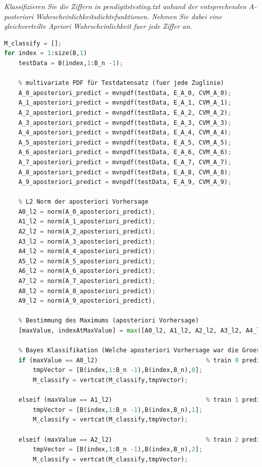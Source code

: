 \documentclass[12pt]{article}
\begin{document}
\textit{Klassifizieren Sie die Ziffern in pendigits­testing.txt​ anhand der entsprechenden A­-posteriori­ Wahrscheinlichkeitsdichtefunktionen. Nehmen Sie dabei eine gleichverteilte A­priori ­Wahrscheinlichkeit fuer jede Ziffer an.}
\begin{lstlisting}[language=Python]
% Klassifizierung der Testdaten (Metrik: L2-Norm)
M_classify = [];
for index = 1:size(B,1)
    testData = B(index,1:B_n -1);
    
    % multivariate PDF für Testdatensatz (fuer jede Zuglinie)
    A_0_aposteriori_predict = mvnpdf(testData, E_A_0, CVM_A_0);
    A_1_aposteriori_predict = mvnpdf(testData, E_A_1, CVM_A_1);
    A_2_aposteriori_predict = mvnpdf(testData, E_A_2, CVM_A_2);
    A_3_aposteriori_predict = mvnpdf(testData, E_A_3, CVM_A_3);
    A_4_aposteriori_predict = mvnpdf(testData, E_A_4, CVM_A_4);
    A_5_aposteriori_predict = mvnpdf(testData, E_A_5, CVM_A_5);
    A_6_aposteriori_predict = mvnpdf(testData, E_A_6, CVM_A_6);
    A_7_aposteriori_predict = mvnpdf(testData, E_A_7, CVM_A_7);
    A_8_aposteriori_predict = mvnpdf(testData, E_A_8, CVM_A_8);
    A_9_aposteriori_predict = mvnpdf(testData, E_A_9, CVM_A_9);
    
    % L2 Norm der aposteriori Vorhersage
    A0_l2 = norm(A_0_aposteriori_predict);
    A1_l2 = norm(A_1_aposteriori_predict);
    A2_l2 = norm(A_2_aposteriori_predict);
    A3_l2 = norm(A_3_aposteriori_predict);
    A4_l2 = norm(A_4_aposteriori_predict);
    A5_l2 = norm(A_5_aposteriori_predict);
    A6_l2 = norm(A_6_aposteriori_predict);
    A7_l2 = norm(A_7_aposteriori_predict);
    A8_l2 = norm(A_8_aposteriori_predict);
    A9_l2 = norm(A_9_aposteriori_predict);
    
    % Bestimmung des Maximums (aposteriori Vorhersage)
    [maxValue, indexAtMaxValue] = max([A0_l2, A1_l2, A2_l2, A3_l2, A4_l2, A5_l2, A6_l2, A7_l2, A8_l2, A9_l2]);
    
    % Bayes Klassifikation (Welche aposteriori Vorhersage war die Groesste?)
    if (maxValue == A0_l2)                              % train 0 predicted
        tmpVector = [B(index,1:B_n -1),B(index,B_n),0];
        M_classify = vertcat(M_classify,tmpVector);
        
    elseif (maxValue == A1_l2)                          % train 1 predicted
        tmpVector = [B(index,1:B_n -1),B(index,B_n),1];
        M_classify = vertcat(M_classify,tmpVector);

    elseif (maxValue == A2_l2)                          % train 2 predicted
        tmpVector = [B(index,1:B_n -1),B(index,B_n),2];
        M_classify = vertcat(M_classify,tmpVector);


\end{lstlisting}
\end{document}
